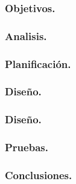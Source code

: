 \subsubsection*{Objetivos.}

\subsubsection*{Analisis.}

\subsubsection*{Planificación.}

\subsubsection*{Diseño.}

\subsubsection*{Diseño.}

\subsubsection*{Pruebas.}

\subsubsection*{Conclusiones.}

